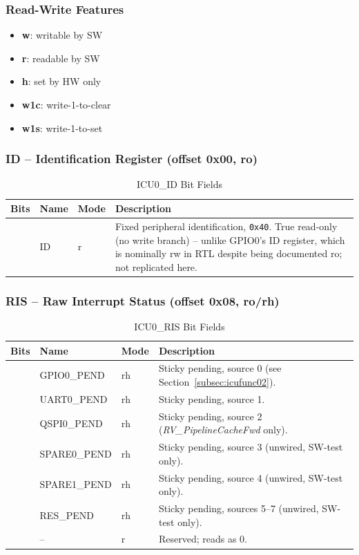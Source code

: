 \subsubsection{Read-Write Features}
\begin{itemize}
  \item \textbf{w}: writable by SW
  \item \textbf{r}: readable by SW
  \item \textbf{h}: set by HW only
  \item \textbf{w1c}: write-1-to-clear
  \item \textbf{w1s}: write-1-to-set
\end{itemize}

\subsubsection{ID -- Identification Register (offset 0x00, ro)}

\begin{table}[H]
\caption{ICU0\_ID Bit Fields}
\label{tab:asIcuID}
\centering
\begin{tabularx}{\textwidth}{|l |l |l |X|}
  \hline
  Bits & Name & Mode & Description \\
  \hline
  \hline
  [63:0] & ID & r & Fixed peripheral identification, \texttt{0x40}.
    True read-only (no write branch) -- unlike GPIO0's ID register, which
    is nominally rw in RTL despite being documented ro; not replicated
    here. \\
  \hline
\end{tabularx}
\end{table}

\subsubsection{RIS -- Raw Interrupt Status (offset 0x08, ro/rh)}

\begin{table}[H]
\caption{ICU0\_RIS Bit Fields}
\label{tab:asIcuRIS}
\centering
\begin{tabularx}{\textwidth}{|l |l |l |X|}
  \hline
  Bits & Name & Mode & Description \\
  \hline
  \hline
  [0] & GPIO0\_PEND  & rh & Sticky pending, source 0 (see Section~\ref{subsec:icufunc02}). \\
  \hline
  [1] & UART0\_PEND  & rh & Sticky pending, source 1. \\
  \hline
  [2] & QSPI0\_PEND  & rh & Sticky pending, source 2 (\textit{RV\_PipelineCacheFwd} only). \\
  \hline
  [3] & SPARE0\_PEND & rh & Sticky pending, source 3 (unwired, SW-test only). \\
  \hline
  [4] & SPARE1\_PEND & rh & Sticky pending, source 4 (unwired, SW-test only). \\
  \hline
  [7:5] & RES\_PEND  & rh & Sticky pending, sources 5--7 (unwired, SW-test only). \\
  \hline
  [63:8] & -- & r & Reserved; reads as 0. \\
  \hline
\end{tabularx}
\end{table}

